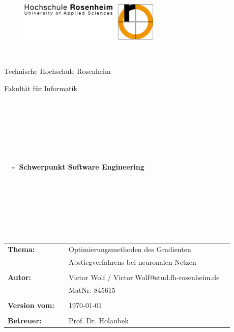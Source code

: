 \thispagestyle{empty}


\begin{figure}
 \begin{flushright}
 \includegraphics[width=0.6\textwidth]{abb/FHRO_Logo.PNG}
 \end{flushright}
\end{figure}


\begin{verbatim}


\end{verbatim}

\begin{center}
\Large{Technische Hochschule Rosenheim}
\end{center}


\begin{center}
\Large{Fakultät für Informatik}
\end{center}
\begin{verbatim}




\end{verbatim}
\begin{center}
\doublespacing
\textbf{\LARGE{\titleDocument}}\\
\singlespacing
\begin{verbatim}

\end{verbatim}
\textbf{{~\subjectDocument~-~Schwerpunkt Software Engineering}}
\end{center}
\begin{verbatim}

\end{verbatim}
\begin{center}

\end{center}

\begin{verbatim}






\end{verbatim}
\begin{flushleft}
\begin{tabular}{llll}
\textbf{Thema:} & & Optimierungsmethoden des Gradienten\\ & & Abstiegverfahrens bei neuronalen Netzen & \\
& & \\
\textbf{Autor:} & & Victor Wolf / Victor.Wolf@stud.fh-rosenheim.de& \\
& & MatNr. 845615 & \\
& & \\
\textbf{Version vom:} & & \today &\\
& & \\
\textbf{Betreuer:} & & Prof. Dr. Holaubek &\\
\end{tabular}
\end{flushleft}
